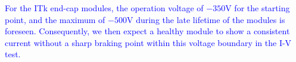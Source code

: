 \textcolor{blue}{For the ITk end-cap modules, the operation voltage of $-350 \si{\volt}$ for the starting point, and the maximum of $-500 \si{\volt}$ during the late lifetime of the modules is foreseen. Consequently, we then expect a healthy module to show a consistent current without a sharp braking point within this voltage boundary in the I-V test.}















